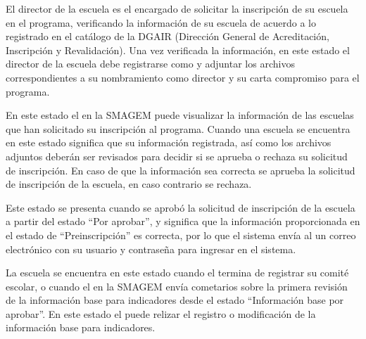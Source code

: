 \begin{description}


      El director de la escuela es el encargado de solicitar la inscripción de su escuela en el programa, verificando la información de su escuela de acuerdo a lo registrado en el catálogo de la DGAIR (Dirección General de Acreditación, Inscripción y Revalidación). Una vez verificada la información, en este estado el director de la escuela debe registrarse como  y adjuntar los archivos correspondientes a su nombramiento como director y su carta compromiso para el programa.

       En este estado el  en la SMAGEM puede visualizar la información de las escuelas que han solicitado su inscripción al programa. Cuando una escuela se encuentra en este estado significa que su información registrada, así como los archivos adjuntos deberán ser revisados para decidir si se aprueba o rechaza su solicitud de inscripción. En caso de que la información sea correcta se aprueba la solicitud de inscripción de la escuela, en caso contrario se rechaza.


       Este estado se presenta cuando se aprobó la solicitud de inscripción de la escuela a partir del estado ``Por aprobar'', y significa que la información proporcionada en el estado de  ``Preinscripción'' es correcta, por lo que el sistema envía al  un correo electrónico con su usuario y contraseña para ingresar en el sistema.

       La escuela se encuentra en este estado cuando el  termina de registrar su comité escolar, o cuando el  en la SMAGEM envía cometarios sobre la primera revisión de la información base para indicadores desde el estado ``Información base por aprobar''. En este estado el  puede relizar el registro o modificación de la información base para indicadores.


\end{description}
